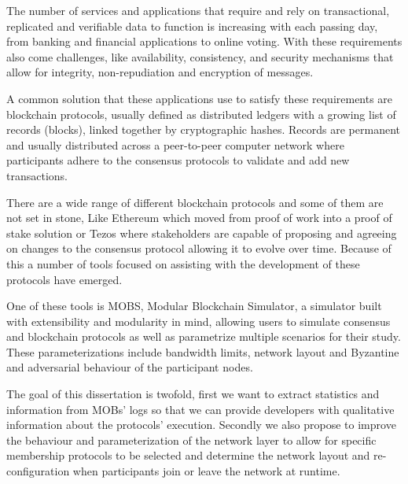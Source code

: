 
%

The number of services and applications that require and rely on transactional, replicated and verifiable data to 
function is increasing with each passing day, from banking and financial applications to online voting. With these
requirements also come challenges, like availability, consistency, and security mechanisms that allow for integrity, non-repudiation and
encryption of messages.

A common solution that these applications use to satisfy these requirements are blockchain protocols, usually defined as
distributed ledgers with a growing list of records (blocks), linked together by cryptographic hashes. Records are permanent and
usually distributed across a peer-to-peer computer network where participants adhere to the consensus protocols to validate and add
new transactions.

There are a wide range of different blockchain protocols and some of them are not set in stone, Like Ethereum which moved from proof of work
into a proof of stake solution or Tezos where stakeholders are capable of proposing and agreeing on changes to the consensus protocol allowing
it to evolve over time. Because of this a number of tools focused on assisting with the development of these protocols have emerged.

One of these tools is MOBS, Modular Blockchain Simulator, a simulator built with extensibility and
modularity in mind, allowing users to simulate consensus and blockchain protocols as well as parametrize multiple scenarios for their study.
These parameterizations include bandwidth limits, network layout and Byzantine and adversarial behaviour of the participant nodes.

The goal of this dissertation is twofold, first we want to extract statistics and information from MOBs' logs so that we can provide
developers with qualitative information about the protocols' execution. Secondly we also propose to improve the
behaviour and parameterization of the network layer to allow for specific membership protocols to be selected and determine
the network layout and re-configuration when participants join or leave the network at runtime.

